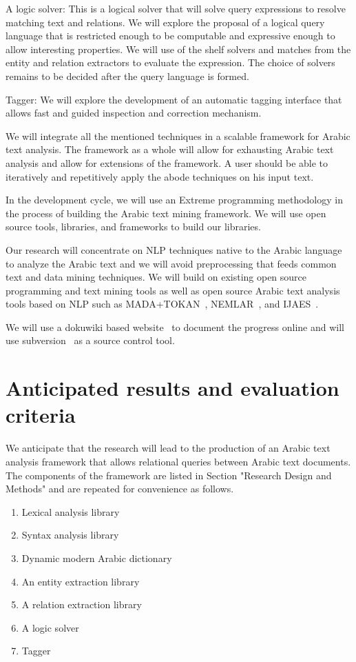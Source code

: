 \documentclass[12pt]{article}
\begin{document}
A logic solver: This is a logical solver that will solve query expressions to resolve matching text and relations.
 We will explore the proposal of a logical query language that is restricted enough to be computable and expressive enough to allow interesting properties.
 We will use of the shelf solvers and matches from the entity and relation extractors to evaluate the expression.
 The choice of solvers remains to be decided after the query language is formed.
 
Tagger: We will explore the development of an automatic tagging interface that allows fast and guided inspection and correction mechanism.
 
We will integrate all the mentioned techniques in a scalable framework for Arabic text analysis.
 The framework as a whole will allow for exhausting Arabic text analysis and allow for extensions of the framework.
 A user should be able to iteratively and repetitively apply the abode techniques on his input text.


In the development cycle, we will use an Extreme programming methodology in the process of building the Arabic text mining framework.
 We will use open source tools, libraries, and frameworks to build our libraries.
 
Our research will concentrate on NLP techniques native to the Arabic language to analyze the Arabic text and we will avoid preprocessing that feeds common text and data mining techniques.
 We will build on existing open source programming and text mining tools as well as open source Arabic text analysis tools based on NLP such as MADA+TOKAN~\cite{Rot08}, NEMLAR~\cite{RAl09}, and IJAES~\cite{Int09}.

We will use a dokuwiki based website~\cite{Dok09} to document the progress online and will use subversion~\cite{Sub09} as a source control tool.




\section{Anticipated results and evaluation criteria}
\label{s:results}


We anticipate that the research will lead to the production of an Arabic text analysis framework that allows relational queries between Arabic text documents.
 The components of the framework are listed in Section "Research Design and Methods" and are repeated for convenience as follows.
 \begin{enumerate}
 \item Lexical analysis library 
 \item Syntax analysis library
\item Dynamic modern Arabic dictionary
\item An entity extraction library
\item A relation extraction library
\item A logic solver 
\item Tagger
\end{enumerate}
\end{document}
